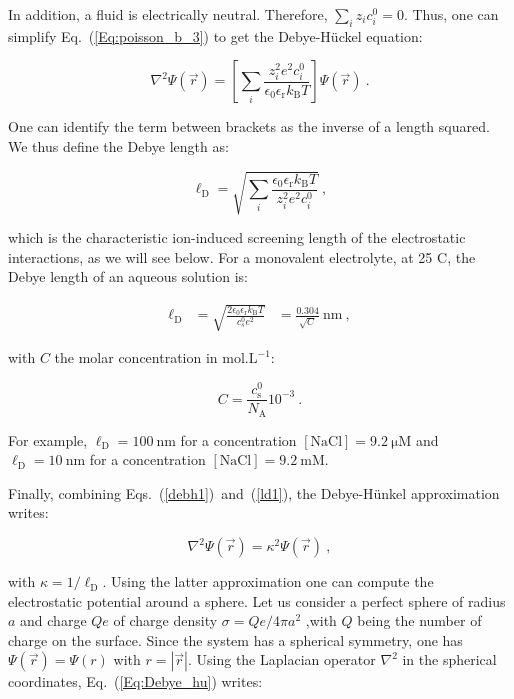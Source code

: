In addition, a fluid is electrically neutral. Therefore, $\sum_i z_i c_i^0 = 0$. Thus, one can simplify Eq.~(\ref{Eq:poisson_b_3}) to get the Debye-Hückel equation:

\begin{equation}
	\nabla^2 \Psi (\vec{r}) = \left[  \sum_i \frac{z_i ^2 e^2 c_i^0}{\epsilon_0 \epsilon_\mathrm{r}  k_\mathrm{B} T}    \right] \Psi (\vec{r}) ~.
	\label{debh1}
\end{equation}

One can identify the term between brackets as the inverse of a length squared. We thus define the Debye length as:

\begin{equation}
	\ell _\mathrm{D} =  \sqrt{ \sum_i\frac {\epsilon_0 \epsilon_\mathrm{r} k_\mathrm{B} T} {z_i ^2 e^2 c_i^0}} ~,
	\label{ld1}
\end{equation}

which is the characteristic ion-induced screening length of the electrostatic interactions, as we will see below. For a monovalent electrolyte,  at 25 \textdegree C, the Debye length of an aqueous solution is:

\begin{equation}
	\begin{aligned}
		\ell _\mathrm{D} &= \sqrt{\frac{ 2 \epsilon_0 \epsilon_\mathrm{r} k_\mathrm{B}T}{c_s^0 e^2}}
		& = \frac{0.304 }{ \sqrt{C} } ~\mathrm{nm} ~,
	\end{aligned}
\end{equation}


with $C$ the molar concentration in $\mathrm{mol.L^{-1}}$:

\begin{equation}
	C = \frac{c_\mathrm{s} ^0}{N_\mathrm{A}} 10^{-3} ~. 
\end{equation}


For example,  $\ell_\mathrm{D} = 100 ~ \mathrm{nm}$ for a concentration  $[\mathrm{NaCl}] = 9.2 ~ \mathrm{\mu M}$ and   $\ell_\mathrm{D} = 10 ~  \mathrm{nm}$ for a concentration  $[\mathrm{NaCl}] = 9.2 ~ \mathrm{mM}$.



Finally, combining Eqs.~(\ref{debh1})~and~(\ref{ld1}),  the Debye-Hünkel approximation writes:

\begin{equation}
	\nabla^2 \Psi (\vec{r}) = \kappa^2  \Psi (\vec{r}) ~,
	\label{Eq:Debye_hu}
\end{equation}

with $\kappa = 1/\ell _\mathrm{D}$. Using the latter approximation one can compute the electrostatic potential around a sphere. Let us consider a perfect sphere of radius $a$ and charge $Qe$ of charge density $\sigma = Qe/4\pi a^2$ ,with $Q$ being the number of charge on the surface. Since the system has a spherical symmetry, one has $\Psi (\vec{r}) = \Psi(r)$ with $r = |\vec{r}|$. Using the Laplacian operator $\nabla ^2$ in the spherical coordinates, Eq.~(\ref{Eq:Debye_hu}) writes:

